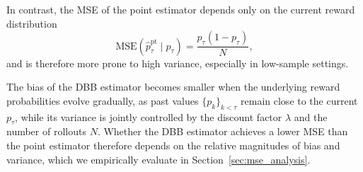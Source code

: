 In contrast, the MSE of the point estimator depends only on the current reward distribution
\begin{equation}
\mathrm{MSE}\!\left(\hat{p}_\tau^{\mathrm{pt}} \mid p_\tau \right)
=
\frac{p_\tau(1-p_\tau)}{N},
\label{eq:pt_mse_pseq}
\end{equation}
and is therefore more prone to high variance, especially in low-sample settings.


The bias of the DBB estimator becomes smaller when the underlying reward probabilities evolve gradually, as past values $\{p_k\}_{k<\tau}$ remain close to the current $p_\tau$, while its variance is jointly controlled by the discount factor $\lambda$ and the number of rollouts $N$.
Whether the DBB estimator achieves a lower MSE than the point estimator therefore depends on the relative magnitudes of bias and variance, which we empirically evaluate in Section~\ref{sec:mse_analysis}.






